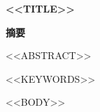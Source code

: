 \documentclass[UTF8,a4paper,zihao=-4,fontset=fandol]{ctexart}
\begin{document}
\begin{center}
  {\bfseries <<TITLE>>}
\end{center}

\begin{center}
  {\bfseries 摘\quad 要}
\end{center}

<<ABSTRACT>>

<<KEYWORDS>>

\newpage

<<BODY>>
\end{document}
